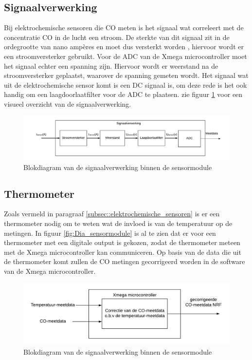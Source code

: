 \documentclass[a4paper, 11pt]{article} %
\begin{document}
	\subsection{Signaalverwerking} \label{subsec::signaalverwerking}
	Bij elektrochemische sensoren die CO meten is het signaal wat correleert met de concentratie CO in de lucht een stroom. De sterkte van dit signaal zit in de ordegrootte van nano ampères en moet dus versterkt worden \cite{SGX Intro}\cite{SGX datasheet}, hiervoor wordt er een stroomversterker gebruikt. Voor de ADC van de Xmega microcontroller moet het signaal echter een spanning zijn. Hiervoor wordt er weerstand na de stroomversterker geplaatst, waarover de spanning gemeten wordt. Het signaal wat uit de elektrochemische sensor komt is een DC signaal is, om deze rede is het ook handig om een laagdoorlaatfilter voor de ADC te plaatsen. zie figuur \ref{fig:Dia_sigverwerking} voor een visueel overzicht van de signaalverwerking.
	\newpage
	\begin{figure}[h!]
		\centering
		\hspace*{-2cm} 
		\includegraphics[width=1.4\linewidth]{afbeeldingen/Dia_sigverwerking.png}
		\caption{Blokdiagram van de signaalverwerking binnen de sensormodule}
		\label{fig:Dia_sigverwerking}
	\end{figure}

	\subsection{Thermometer} \label{subsec::Thermometer}
	Zoals vermeld in paragraaf \ref{subsec::elektrochemische_sensoren} is er een thermometer nodig om te weten wat de invloed is van de temperatuur op de metingen. In figuur \ref{fig:Dia_sensormodule} is al te zien dat er voor een thermometer met een digitale output is gekozen, zodat de thermometer meteen met de Xmega microcontroller kan communiceren. Op basis van de data die uit de thermometer komt zullen de CO metingen gecorrigeerd worden in de software van de Xmega microcontroller.
	\begin{figure}[h!]
		\centering
		\hspace*{-1.5cm} 
		\includegraphics[width=1.2\linewidth]{afbeeldingen/Dia_thermometer.png}
		\caption{Blokdiagram van de signaalverwerking binnen de sensormodule}
		\label{fig:Dia_Thermometer}
	\end{figure}
\end{document}
